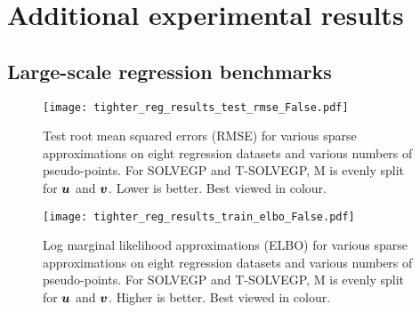 \section{Additional experimental results}
\subsection{Large-scale regression benchmarks}
\begin{figure*}[!ht]
    \centering
    \texttt{[image: tighter\_reg\_results\_test\_rmse\_False.pdf]}
    \caption{Test root mean squared errors (RMSE) for various sparse approximations on eight regression datasets and various numbers of pseudo-points. For SOLVEGP and T-SOLVEGP, M is evenly split for ${\bm{u}}$ and ${\bm{v}}$. Lower is better. Best viewed in colour.}
    \label{fig:reg_rmse}
\end{figure*}

\begin{figure*}[!ht]
    \centering
    \texttt{[image: tighter\_reg\_results\_train\_elbo\_False.pdf]}
    \caption{Log marginal likelihood approximations (ELBO) for various sparse approximations on eight regression datasets and various numbers of pseudo-points. For SOLVEGP and T-SOLVEGP, M is evenly split for ${\bm{u}}$ and ${\bm{v}}$. Higher is better. Best viewed in colour.}
    \label{fig:reg_elbo}
\end{figure*}